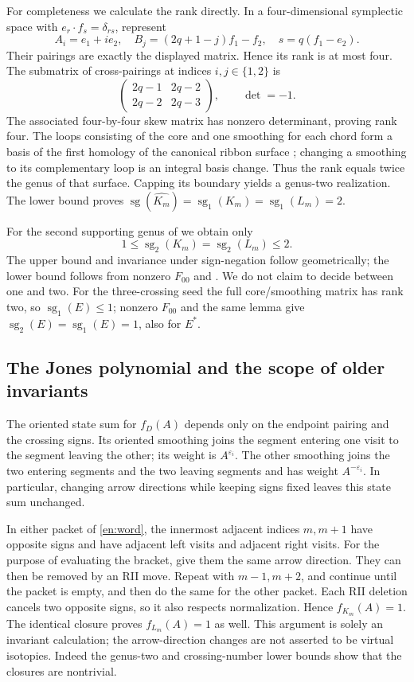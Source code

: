 \documentclass[12pt]{amsart}
\theoremstyle{definition}
\theoremstyle{remark}
\numberwithin{equation}{section}
\newcommand{\sg}{\operatorname{sg}}
\newcommand{\clK}[1]{\widehat{#1}}
\newcommand{\eps}{\varepsilon}
\begin{document}
For completeness we calculate the rank directly. In a four-dimensional
symplectic space with $e_r\cdot f_s=\delta_{rs}$, represent
\[
A_i=e_1+i e_2,\quad B_j=(2q+1-j)f_1-f_2,\quad
s=q(f_1-e_2).
\]
Their pairings are exactly the displayed matrix. Hence its rank is at
most four. The submatrix of cross-pairings at indices $i,j\in\{1,2\}$ is
\[
\begin{pmatrix}2q-1&2q-2\\2q-2&2q-3\end{pmatrix},
\qquad \det=-1.
\]
The associated four-by-four skew matrix has nonzero determinant, proving
rank four. The loops consisting of the core and one smoothing for each
chord form a basis of the first homology of the canonical ribbon surface
\cite[\S4.2]{Turaev}; changing a smoothing to its complementary loop is
an integral basis change. Thus the rank equals twice the genus of that
surface. Capping its boundary yields a genus-two realization. The lower
bound proves $\sg(\clK {K_m})=\sg_1(K_m)=\sg_1(L_m)=2$.

For the second supporting genus of \cite[Definition 3.5]{NNSW2} we obtain
only
\[
1\le\sg_2(K_m)=\sg_2(L_m)\le2.
\]
The upper bound and invariance under sign-negation follow geometrically;
the lower bound follows from nonzero $F_{00}$ and
\cite[Lemma 3.6(ii)]{NNSW2}. We do not claim to decide between one and two.
For the three-crossing seed the full core/smoothing matrix has rank two,
so $\sg_1(E)\le1$; nonzero $F_{00}$ and the same lemma give
$\sg_2(E)=\sg_1(E)=1$, also for $E^*$.

\subsection{The Jones polynomial and the scope of older invariants}
The oriented state sum for $f_D(A)$ depends only on the endpoint pairing
and the crossing signs. Its oriented smoothing joins the segment entering
one visit to the segment leaving the other; its weight is $A^{\eps_i}$.
The other smoothing joins the two entering segments and the two leaving
segments and has weight $A^{-\eps_i}$. In particular, changing arrow
directions while keeping signs fixed leaves this state sum unchanged.

In either packet of \eqref{en:word}, the innermost adjacent indices
$m,m+1$ have opposite signs and have adjacent left visits and adjacent
right visits. For the purpose of evaluating the bracket, give them the
same arrow direction. They can then be removed by an RII move. Repeat
with $m-1,m+2$, and continue until the packet is empty, and then do the
same for the other packet. Each RII deletion cancels two opposite signs,
so it also respects normalization. Hence $f_{K_m}(A)=1$. The identical
closure proves $f_{L_m}(A)=1$ as well. This argument is solely an invariant
calculation; the arrow-direction changes are not asserted to be virtual
isotopies. Indeed the genus-two and crossing-number lower bounds show
that the closures are nontrivial.
\end{document}
